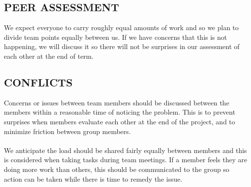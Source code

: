 \documentclass[11pt]{article}
\begin{document}
\subsection{PEER ASSESSMENT}

We expect everyone to carry roughly equal amounts of work and so we plan to divide team 
points equally between us. If we have concerns that this is not happening, we will 
discuss it so there will not be surprises in our assessment of each other at the end of term.


\subsection{CONFLICTS}

Concerns or issues between team members should be discussed between the members within 
a reasonable time of noticing the problem. This is to prevent surprises when members 
evaluate each other at the end of the project, and to minimize friction between 
group members.
\\ \\
We anticipate the load should be shared fairly equally between members and 
this is considered when taking tasks during team meetings. If a member feels 
they are doing more work than others, this should be communicated to the group so action 
can be taken while there is time to remedy the issue.
\end{document}
